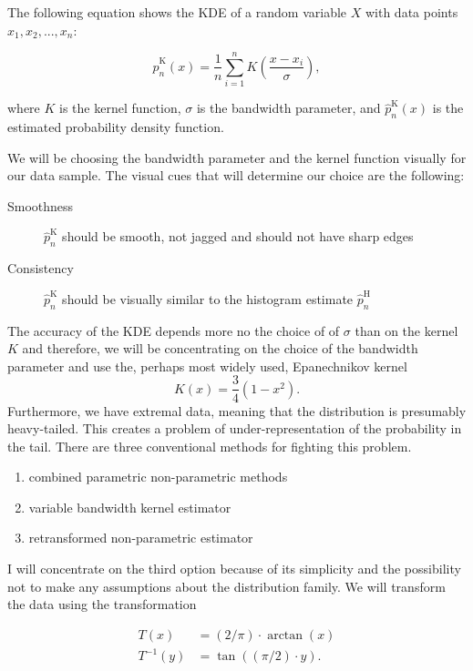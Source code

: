 The following equation shows the \ac{KDE} of a random variable $X$ with data points $x_1, x_2, ..., x_n$:

\[
    \hat{p}_n^{\text{K}}(x) = \frac{1}{n} \sum_{i=1}^n K\left( \frac{x - x_i}{\sigma} \right),
\]

where \(K\) is the kernel function, \(\sigma\) is the bandwidth parameter, and \(\hat{p}_n^{\text{K}}(x)\) is the estimated probability density function.

We will be choosing the bandwidth parameter and the kernel function visually for our data sample. The visual cues that
will determine our choice are the following:
\begin{description}
    \item[\label{itm:desc_cues_smoothness}Smoothness] \(\hat{p}_n^{\text{K}}\) should be smooth, not jagged and should not have sharp edges
    \item[\label{itm:desc_cues_consistency}Consistency] \(\hat{p}_n^{\text{K}}\) should be visually similar to the histogram estimate \(\hat{p}_n^{\text{H}}\)
\end{description}

The accuracy of the \ac{KDE} depends more no the choice of of \(\sigma\) than on the kernel \(K\) \cite{markovichClassicalMethodsProbability2007}
and therefore, we will be concentrating on the choice of the bandwidth parameter and use the, perhaps most widely used,
Epanechnikov kernel
\[
    K(x)=\frac{3}{4}(1-x^{2}).
\] 
Furthermore, we have extremal data, meaning that the distribution is presumably heavy-tailed. This creates a problem
of under-representation of the probability in the tail. There are three conventional methods for fighting this problem.

\begin{enumerate}[label=\alph*)]
    \item combined parametric non-parametric methods
    \item variable bandwidth kernel estimator
    \item retransformed non-parametric estimator
\end{enumerate}

I will concentrate on the third option because of its simplicity and the possibility not to make any assumptions about
the distribution family. We will transform the data using the transformation

\begin{align}
    T(x) &= (2/\pi)\cdot \arctan(x) \\
    T^{-1}(y) &= \tan((\pi/2)\cdot y).
\end{align}


